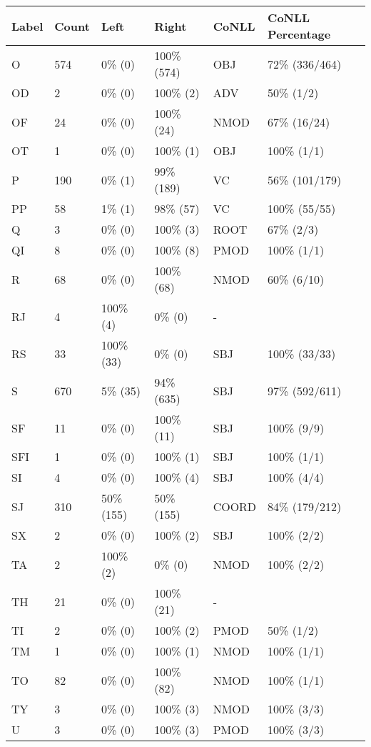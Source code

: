 \begin{figure*}
\begin{tabular}{|l|l|l|l||l|l|}
\hline
Label & Count & Left & Right & CoNLL & CoNLL Percentage\\ 
\hline
 O & 574 & 0\% (0) & 100\% (574) & OBJ & 72\% (336/464) \\ 
\hline
 OD & 2 & 0\% (0) & 100\% (2) & ADV & 50\% (1/2) \\ 
\hline
 OF & 24 & 0\% (0) & 100\% (24) & NMOD & 67\% (16/24) \\ 
\hline
 OT & 1 & 0\% (0) & 100\% (1) & OBJ & 100\% (1/1) \\ 
\hline
 P & 190 & 0\% (1) & 99\% (189) & VC & 56\% (101/179) \\ 
\hline
 PP & 58 & 1\% (1) & 98\% (57) & VC & 100\% (55/55) \\ 
\hline
 Q & 3 & 0\% (0) & 100\% (3) & ROOT & 67\% (2/3) \\ 
\hline
 QI & 8 & 0\% (0) & 100\% (8) & PMOD & 100\% (1/1) \\ 
\hline
 R & 68 & 0\% (0) & 100\% (68) & NMOD & 60\% (6/10) \\ 
\hline
 RJ & 4 & 100\% (4) & 0\% (0) & - &  \\ 
\hline
 RS & 33 & 100\% (33) & 0\% (0) & SBJ & 100\% (33/33) \\ 
\hline
 S & 670 & 5\% (35) & 94\% (635) & SBJ & 97\% (592/611) \\ 
\hline
 SF & 11 & 0\% (0) & 100\% (11) & SBJ & 100\% (9/9) \\ 
\hline
 SFI & 1 & 0\% (0) & 100\% (1) & SBJ & 100\% (1/1) \\ 
\hline
 SI & 4 & 0\% (0) & 100\% (4) & SBJ & 100\% (4/4) \\ 
\hline
 SJ & 310 & 50\% (155) & 50\% (155) & COORD & 84\% (179/212) \\ 
\hline
 SX & 2 & 0\% (0) & 100\% (2) & SBJ & 100\% (2/2) \\ 
\hline
 TA & 2 & 100\% (2) & 0\% (0) & NMOD & 100\% (2/2) \\ 
\hline
 TH & 21 & 0\% (0) & 100\% (21) & - &  \\ 
\hline
 TI & 2 & 0\% (0) & 100\% (2) & PMOD & 50\% (1/2) \\ 
\hline
 TM & 1 & 0\% (0) & 100\% (1) & NMOD & 100\% (1/1) \\ 
\hline
 TO & 82 & 0\% (0) & 100\% (82) & NMOD & 100\% (1/1) \\ 
\hline
 TY & 3 & 0\% (0) & 100\% (3) & NMOD & 100\% (3/3) \\ 
\hline
 U & 3 & 0\% (0) & 100\% (3) & PMOD & 100\% (3/3) \\ 

\end{tabular}
\end{figure*}
